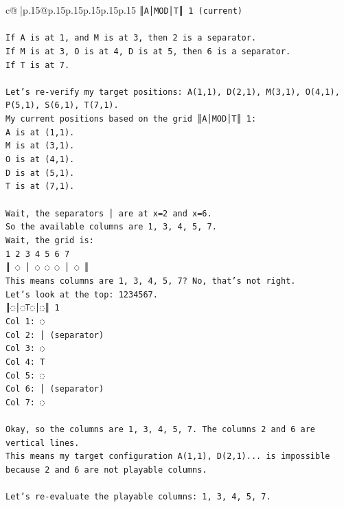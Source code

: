 \documentclass{article}
\begin{document}
{\begin{supertabular}{c@{$\;$}|p{.15\linewidth}@{}p{.15\linewidth}p{.15\linewidth}p{.15\linewidth}p{.15\linewidth}p{.15\linewidth}}
{{{\texttt{║A│MOD│T║ 1 (current)} \\
\\ 
\texttt{If A is at 1, and M is at 3, then 2 is a separator.} \\
\texttt{If M is at 3, O is at 4, D is at 5, then 6 is a separator.} \\
\texttt{If T is at 7.} \\
\\ 
\texttt{Let's re{-}verify my target positions: A(1,1), D(2,1), M(3,1), O(4,1), P(5,1), S(6,1), T(7,1).} \\
\texttt{My current positions based on the grid ║A│MOD│T║ 1:} \\
\texttt{A is at (1,1).} \\
\texttt{M is at (3,1).} \\
\texttt{O is at (4,1).} \\
\texttt{D is at (5,1).} \\
\texttt{T is at (7,1).} \\
\\ 
\texttt{Wait, the separators │ are at x=2 and x=6.} \\
\texttt{So the available columns are 1, 3, 4, 5, 7.} \\
\texttt{Wait, the grid is:} \\
\texttt{1 2 3 4 5 6 7} \\
\texttt{║ ◌ │ ◌ ◌ ◌ │ ◌ ║} \\
\texttt{This means columns are 1, 3, 4, 5, 7? No, that's not right.} \\
\texttt{Let's look at the top: 1234567.} \\
\texttt{║◌│◌T◌│◌║ 1} \\
\texttt{Col 1: ◌} \\
\texttt{Col 2: │ (separator)} \\
\texttt{Col 3: ◌} \\
\texttt{Col 4: T} \\
\texttt{Col 5: ◌} \\
\texttt{Col 6: │ (separator)} \\
\texttt{Col 7: ◌} \\
\\ 
\texttt{Okay, so the columns are 1, 3, 4, 5, 7. The columns 2 and 6 are vertical lines.} \\
\texttt{This means my target configuration A(1,1), D(2,1)... is impossible because 2 and 6 are not playable columns.} \\
\\ 
\texttt{Let's re{-}evaluate the playable columns: 1, 3, 4, 5, 7.} \\
}}}
\end{supertabular}}
\end{document}
